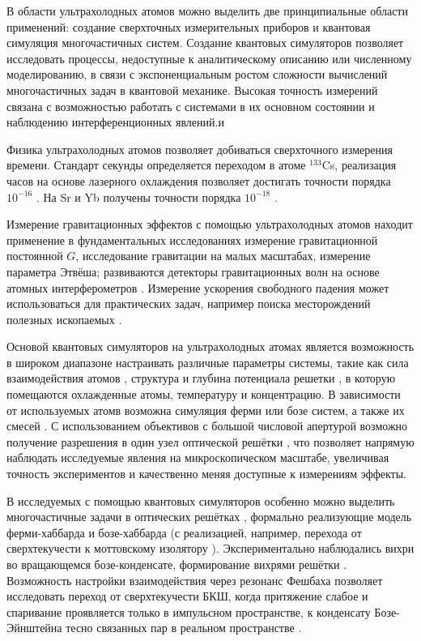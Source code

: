 В области ультрахолодных атомов можно выделить две принципиальные области применений: создание сверхточных измерительных приборов и квантовая симуляция многочастичных систем. Создание квантовых симуляторов позволяет исследовать процессы, недоступные к аналитическому описанию или численному моделированию, в связи с экспоненциальным ростом сложности вычислений многочастичных задач в квантовой механике. Высокая точность измерений связана с возможностью работать с системами в их основном состоянии и наблюдению интерференционных явлений.и





Физика ультрахолодных атомов позволяет добиваться сверхточного измерения времени. Стандарт секунды определяется переходом в атоме ${}^{133}$Cs, реализация часов на основе лазерного охлаждения позволяет достигать точности порядка $10^{-16}$ \cite{schmittberger2020review, 799241}. На Sr и Yb получены точности порядка $10^{-18}$ \cite{schmittberger2020review, Bloom_2014}. 

Измерение гравитационных эффектов с помощью ультрахолодных атомов находит применение в фундаментальных исследованиях \cite{Tino_2021} измерение гравитационной постоянной $G$, исследование гравитации на малых масштабах, измерение параметра Этвёша; развиваются детекторы гравитационных волн на основе атомных интерферометров \cite{Dimopoulos_2009}. Измерение ускорения свободного падения может использоваться для практических задач, например поиска месторождений полезных ископаемых \cite{Tino_2021}.




Основой квантовых симуляторов на ультрахолодных атомах является возможность в широком диапазоне настраивать различные параметры системы, такие как сила взаимодействия атомов \cite{bloch2012quantum}
, структура и глубина потенциала решетки \cite{lewenstein_ultracold_2007, gross_quantum_2017, tsyganok2023boseeinstein}, в которую помещаются охлажденные атомы, температуру и концентрацию. В зависимости от используемых атомв возможна симуляция ферми или бозе систем, а также их смесей \cite{yamamoto2012lattice}. С использованием объективов с большой числовой апертурой возможно получение разрешения в один узел оптической решётки \cite{Sherson_2010}, что позволяет напрямую наблюдать исследуемые явления на микроскопическом масштабе, увеличивая точность экспериментов и качественно меняя доступные к измерениям эффекты.  

В исследуемых с помощью квантовых симуляторов особенно можно выделить многочастичные задачи в оптических решётках \cite{bloch_many-body_2008}, формально реализующие модель ферми-хаббарда и бозе-хаббарда (с реализацией, например, перехода от сверхтекучести к моттовскому изолятору \cite{Greiner2002}). Экспериментально наблюдались вихри во вращающемся бозе-конденсате, формирование вихрями решётки \cite{Klaus_2022}.  Возможность настройки взаимодействия через резонанс Фешбаха позволяет исследовать переход от сверхтекучести БКШ, когда притяжение слабое и спаривание проявляется только в импульсном пространстве, к конденсату Бозе-Эйнштейна тесно связанных пар в реальном пространстве \cite{bloch_many-body_2008}.

